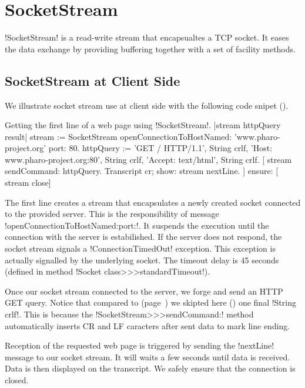 \documentclass[a4paper,10pt,twoside]{book}
\begin{document}
\section{SocketStream}
\label{sec:socketStream}
\ct!SocketStream! is a read-write stream that encapsualtes a TCP socket.
It eases the data exchange by providing buffering together with a set of facility methods.

\subsection{SocketStream at Client Side}
We illustrate socket stream use at client side with the following code snipet ().

\begin{script}{Getting the first line of a web page using \ct!SocketStream!.}
	|stream httpQuery result|
	stream := SocketStream openConnectionToHostNamed: 'www.pharo-project.org' port: 80.
	httpQuery := 'GET / HTTP/1.1', String crlf, 
		'Host: www.pharo-project.org:80', String crlf, 
		'Accept: text/html', String crlf.
	[
		stream sendCommand: httpQuery.
		Transcript cr; show: stream nextLine.
	] ensure: [
		stream close]
\end{script}

The first line creates a stream that encapsulates a newly created socket connected to the provided server.
This is the responsibility of message \ct!openConnectionToHostNamed:port:!.
It suspends the execution until the connection with the server is estabilished.
If the server does not respond, the socket stream signals a \ct!ConnectionTimedOut! exception.
This exception is actually signalled by the underlying socket.
The timeout delay is 45 seconds (defined in method \ct!Socket class>>>standardTimeout!).

Once our socket stream connected to the server, we forge and send an HTTP GET query.
Notice that compared to  (page~\pageref{scr:script:closeAndDestroy}) we skipted here () one final \ct!String crlf!.
This is because the \ct!SocketStream>>>sendCommand:! method automatically inserts CR and LF caracters after sent data to mark line ending.

Reception of the requested web page is triggered by sending the \ct!nextLine! message to our socket stream.
It will waits a few seconds until data is received.
Data is then displayed on the transcript.
We safely ensure that the connection is closed.
\end{document}
